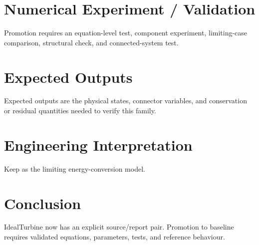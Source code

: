 \documentclass[10pt,a4paper]{article}
\begin{document}
\section{Numerical Experiment / Validation}Promotion requires an equation-level test, component experiment, limiting-case comparison, structural check, and connected-system test.
\section{Expected Outputs}Expected outputs are the physical states, connector variables, and conservation or residual quantities needed to verify this family.
\section{Engineering Interpretation}Keep as the limiting energy-conversion model.
\section*{Conclusion}IdealTurbine now has an explicit source/report pair. Promotion to baseline requires validated equations, parameters, tests, and reference behaviour.
\end{document}
